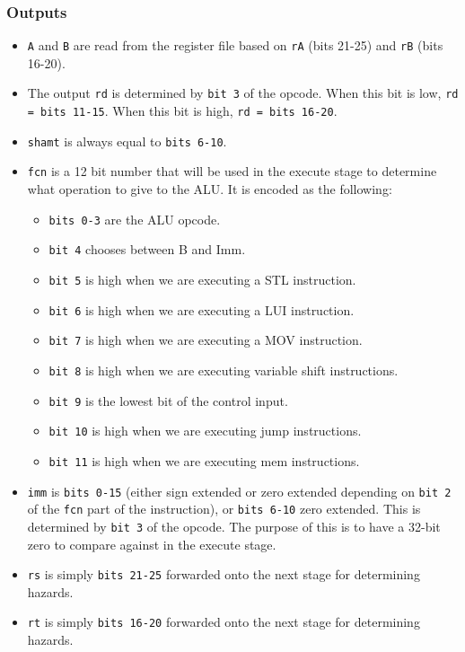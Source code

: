 \documentclass[10pt]{article}
\begin{document}
\subsubsection{Outputs}
\begin{itemize}
\item \texttt{A} and \texttt{B} are read from the register file based on \texttt{rA} (bits 21-25) and \texttt{rB} (bits 16-20).
\item The output \texttt{rd} is determined by \texttt{bit 3} of the opcode. When this bit is low, \texttt{rd = bits 11-15}. When this bit is high, \texttt{rd = bits 16-20}.
\item \texttt{shamt} is always equal to \texttt{bits 6-10}.
\item \texttt{fcn} is a 12 bit number that will be used in the execute stage to determine what operation to give to the ALU. It is encoded as the following:
  \begin{itemize}
  \item \texttt{bits 0-3} are the ALU opcode.
  \item \texttt{bit 4} chooses between B and Imm.
  \item \texttt{bit 5} is high when we are executing a STL instruction.
  \item \texttt{bit 6} is high when we are executing a LUI instruction.
  \item \texttt{bit 7} is high when we are executing a MOV instruction.
  \item \texttt{bit 8} is high when we are executing variable shift instructions.
  \item \texttt{bit 9} is the lowest bit of the control input.
  \item \texttt{bit 10} is high when we are executing jump instructions.
  \item \texttt{bit 11} is high when we are executing mem instructions.
  \end{itemize}
\item \texttt{imm} is \texttt{bits 0-15} (either sign extended or zero extended depending on \texttt{bit 2} of the \texttt{fcn} part of the instruction),
  or \texttt{bits 6-10} zero extended. This is determined by \texttt{bit 3} of the opcode.
  The purpose of this is to have a 32-bit zero to compare against in the execute stage.
\item \texttt{rs} is simply \texttt{bits 21-25} forwarded onto the next stage for determining hazards.
\item \texttt{rt} is simply \texttt{bits 16-20} forwarded onto the next stage for determining hazards.
\end{itemize}
\end{document}
